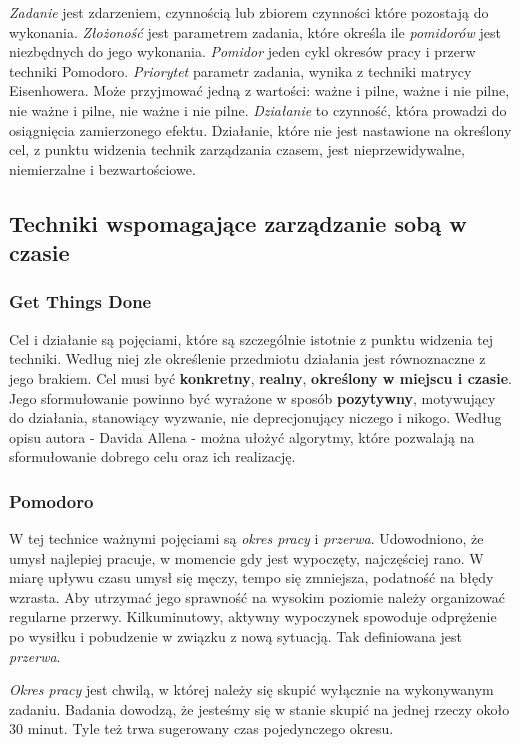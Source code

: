 \textit{Zadanie} jest zdarzeniem, czynnością lub zbiorem czynności które pozostają do wykonania.
\textit{Złożoność} jest parametrem zadania, które określa ile \textit{pomidorów} jest niezbędnych do jego wykonania.
\textit{Pomidor} jeden cykl okresów pracy i przerw techniki Pomodoro.
\textit{Priorytet} parametr zadania, wynika z techniki matrycy Eisenhowera. Może przyjmować jedną z wartości: ważne i pilne, ważne i nie pilne, nie ważne i pilne, nie ważne i nie pilne.
\textit{Działanie} to czynność, która prowadzi do osiągnięcia zamierzonego efektu. Działanie, które nie jest nastawione na określony cel, z punktu widzenia technik zarządzania czasem, jest nieprzewidywalne, niemierzalne i  bezwartościowe.

\subsection{Techniki wspomagające zarządzanie sobą w czasie} %
\label{ssub:techniki_wspomagaj_ce_zarz_dzanie_sob_w_czasie}
\subsubsection{Get Things Done}
Cel i działanie są pojęciami, które są szczególnie istotnie z punktu widzenia tej techniki. Według niej złe określenie przedmiotu działania jest równoznaczne z jego brakiem. Cel musi być \textbf{konkretny}, \textbf{realny}, \textbf{określony w miejscu i czasie}. Jego sformułowanie powinno być wyrażone w sposób \textbf{pozytywny}, motywujący do działania, stanowiący wyzwanie, nie deprecjonujący niczego i nikogo. Według opisu autora - Davida Allena - można ułożyć algorytmy, które pozwalają na sformułowanie dobrego celu oraz ich realizację.

\subsubsection{Pomodoro} %
\label{ssub:pomodoro}
W tej technice ważnymi pojęciami są \textit{okres pracy} i \textit{przerwa}. Udowodniono, że umysł najlepiej pracuje, w momencie gdy jest wypoczęty, najczęściej rano. W miarę upływu czasu umysł się męczy, tempo się zmniejsza, podatność na błędy wzrasta. Aby utrzymać jego sprawność na wysokim poziomie należy organizować regularne przerwy. Kilkuminutowy, aktywny wypoczynek spowoduje odprężenie po wysiłku i pobudzenie w związku z nową sytuacją. Tak definiowana jest \textit{przerwa}.

\textit{Okres pracy} jest chwilą, w której należy się skupić wyłącznie na wykonywanym zadaniu. Badania dowodzą, że jesteśmy się w stanie skupić na jednej rzeczy około 30 minut. Tyle też trwa sugerowany czas pojedynczego okresu.


